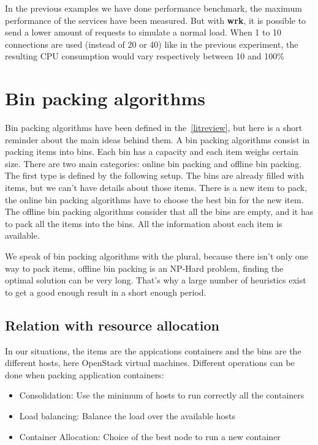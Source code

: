 In the previous examples we have done performance benchmark, the maximum
performance of the services have been measured. But with \textbf{wrk}, it
is possible to send a lower amount of requests to simulate a normal load.
When 1 to 10 connections are used (instead of 20 or 40) like in the previous
experiment, the resulting CPU consumption would vary respectively 
between 10 and 100\%

\section{Bin packing algorithms}

Bin packing algorithms have been defined in the~\cref{litreview}, but here is a
short reminder about the main ideas behind them.  A bin packing algorithms
consist in packing items into bins. Each bin has a capacity and each item
weighs certain size. There are two main categories: online bin packing and
offline bin packing. The first type is defined by the following setup. The bins
are already filled with items, but we can't have details about those items.
There is a new item to pack, the online bin packing algorithms have to choose
the best bin for the new item.  The offline bin packing algorithms consider
that all the bins are empty, and it has to pack all the items into the bins.
All the information about each item is available.

We speak of bin packing algorithms with the plural, because there isn't only
one way to pack items, offline bin packing is an NP-Hard problem, finding the
optimal solution can be very long. That's why a large number of heuristics
exist to get a good enough result in a short enough period.

\subsection{Relation with resource allocation}

In our situations, the items are the appications containers and the bins are
the different hosts, here OpenStack virtual machines. Different operations
can be done when packing application containers:

\begin{itemize}
	\item{Consolidation: Use the minimum of hosts to run correctly all the containers}
	\item{Load balancing: Balance the load over the available hosts}
	\item{Container Allocation: Choice of the best node to run a new container}
\end{itemize}


